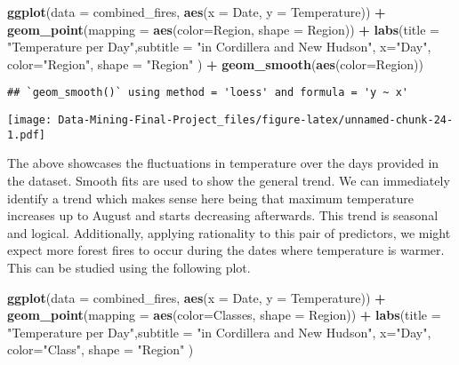 \documentclass[
]{article}
\newenvironment{Shaded}{\begin{snugshade}}{\end{snugshade}}
\newcommand{\AttributeTok}[1]{\textcolor[rgb]{0.13,0.29,0.53}{#1}}
\newcommand{\FunctionTok}[1]{\textcolor[rgb]{0.13,0.29,0.53}{\textbf{#1}}}
\newcommand{\NormalTok}[1]{#1}
\newcommand{\SpecialCharTok}[1]{\textcolor[rgb]{0.81,0.36,0.00}{\textbf{#1}}}
\newcommand{\StringTok}[1]{\textcolor[rgb]{0.31,0.60,0.02}{#1}}
\begin{document}
\begin{Shaded}
\begin{Highlighting}[]
\FunctionTok{ggplot}\NormalTok{(}\AttributeTok{data =}\NormalTok{ combined\_fires, }\FunctionTok{aes}\NormalTok{(}\AttributeTok{x =}\NormalTok{ Date, }\AttributeTok{y =}\NormalTok{ Temperature)) }\SpecialCharTok{+} \FunctionTok{geom\_point}\NormalTok{(}\AttributeTok{mapping =} \FunctionTok{aes}\NormalTok{(}\AttributeTok{color=}\NormalTok{Region, }\AttributeTok{shape =}\NormalTok{ Region)) }\SpecialCharTok{+} \FunctionTok{labs}\NormalTok{(}\AttributeTok{title =} \StringTok{"Temperature per Day"}\NormalTok{,}\AttributeTok{subtitle =} \StringTok{"in Cordillera and New Hudson"}\NormalTok{, }\AttributeTok{x=}\StringTok{"Day"}\NormalTok{, }\AttributeTok{color=}\StringTok{"Region"}\NormalTok{, }\AttributeTok{shape =} \StringTok{"Region"}\NormalTok{ ) }\SpecialCharTok{+} \FunctionTok{geom\_smooth}\NormalTok{(}\FunctionTok{aes}\NormalTok{(}\AttributeTok{color=}\NormalTok{Region))}
\end{Highlighting}
\end{Shaded}

\begin{verbatim}
## `geom_smooth()` using method = 'loess' and formula = 'y ~ x'
\end{verbatim}

\texttt{[image: Data-Mining-Final-Project\_files/figure-latex/unnamed-chunk-24-1.pdf]}

The above showcases the fluctuations in temperature over the days
provided in the dataset. Smooth fits are used to show the general trend.
We can immediately identify a trend which makes sense here being that
maximum temperature increases up to August and starts decreasing
afterwards. This trend is seasonal and logical. Additionally, applying
rationality to this pair of predictors, we might expect more forest
fires to occur during the dates where temperature is warmer. This can be
studied using the following plot.

\begin{Shaded}
\begin{Highlighting}[]
\FunctionTok{ggplot}\NormalTok{(}\AttributeTok{data =}\NormalTok{ combined\_fires, }\FunctionTok{aes}\NormalTok{(}\AttributeTok{x =}\NormalTok{ Date, }\AttributeTok{y =}\NormalTok{ Temperature)) }\SpecialCharTok{+} \FunctionTok{geom\_point}\NormalTok{(}\AttributeTok{mapping =} \FunctionTok{aes}\NormalTok{(}\AttributeTok{color=}\NormalTok{Classes, }\AttributeTok{shape =}\NormalTok{ Region)) }\SpecialCharTok{+} \FunctionTok{labs}\NormalTok{(}\AttributeTok{title =} \StringTok{"Temperature per Day"}\NormalTok{,}\AttributeTok{subtitle =} \StringTok{"in Cordillera and New Hudson"}\NormalTok{, }\AttributeTok{x=}\StringTok{"Day"}\NormalTok{, }\AttributeTok{color=}\StringTok{"Class"}\NormalTok{, }\AttributeTok{shape =} \StringTok{"Region"}\NormalTok{ )}
\end{Highlighting}
\end{Shaded}
\end{document}
